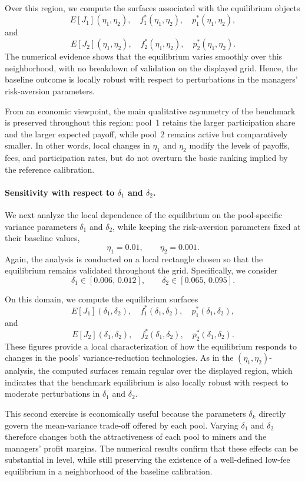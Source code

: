 Over this region, we compute the surfaces associated with the equilibrium objects
\[
E[J_1](\eta_1,\eta_2),\quad f_1^*(\eta_1,\eta_2),\quad p_1^*(\eta_1,\eta_2),
\]
and
\[
E[J_2](\eta_1,\eta_2),\quad f_2^*(\eta_1,\eta_2),\quad p_2^*(\eta_1,\eta_2).
\]
The numerical evidence shows that the equilibrium varies smoothly over this neighborhood, with no breakdown of validation on the displayed grid. Hence, the baseline outcome is locally robust with respect to perturbations in the managers' risk-aversion parameters.

From an economic viewpoint, the main qualitative asymmetry of the benchmark is preserved throughout this region: pool~1 retains the larger participation share and the larger expected payoff, while pool~2 remains active but comparatively smaller. In other words, local changes in \(\eta_1\) and \(\eta_2\) modify the levels of payoffs, fees, and participation rates, but do not overturn the basic ranking implied by the reference calibration.

\paragraph{Sensitivity with respect to \(\delta_1\) and \(\delta_2\).}

We next analyze the local dependence of the equilibrium on the pool-specific variance parameters \(\delta_1\) and \(\delta_2\), while keeping the risk-aversion parameters fixed at their baseline values,
\[
\eta_1=0.01,\qquad \eta_2=0.001.
\]
Again, the analysis is conducted on a local rectangle chosen so that the equilibrium remains validated throughout the grid. Specifically, we consider
\[
\delta_1 \in [0.006,\,0.012],\qquad \delta_2 \in [0.065,\,0.095].
\]

On this domain, we compute the equilibrium surfaces
\[
E[J_1](\delta_1,\delta_2),\quad f_1^*(\delta_1,\delta_2),\quad p_1^*(\delta_1,\delta_2),
\]
and
\[
E[J_2](\delta_1,\delta_2),\quad f_2^*(\delta_1,\delta_2),\quad p_2^*(\delta_1,\delta_2).
\]
These figures provide a local characterization of how the equilibrium responds to changes in the pools' variance-reduction technologies. As in the \((\eta_1,\eta_2)\)-analysis, the computed surfaces remain regular over the displayed region, which indicates that the benchmark equilibrium is also locally robust with respect to moderate perturbations in \(\delta_1\) and \(\delta_2\).

This second exercise is economically useful because the parameters \(\delta_k\) directly govern the mean-variance trade-off offered by each pool. Varying \(\delta_1\) and \(\delta_2\) therefore changes both the attractiveness of each pool to miners and the managers' profit margins. The numerical results confirm that these effects can be substantial in level, while still preserving the existence of a well-defined low-fee equilibrium in a neighborhood of the baseline calibration.


